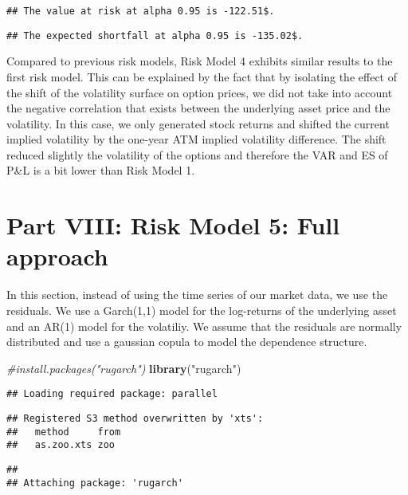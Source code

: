 \documentclass[]{article}
\newenvironment{Shaded}{\begin{snugshade}}{\end{snugshade}}
\newcommand{\CommentTok}[1]{\textcolor[rgb]{0.56,0.35,0.01}{\textit{#1}}}
\newcommand{\KeywordTok}[1]{\textcolor[rgb]{0.13,0.29,0.53}{\textbf{#1}}}
\newcommand{\NormalTok}[1]{#1}
\newcommand{\StringTok}[1]{\textcolor[rgb]{0.31,0.60,0.02}{#1}}
\begin{document}
\begin{verbatim}
## The value at risk at alpha 0.95 is -122.51$.
\end{verbatim}

\begin{verbatim}
## The expected shortfall at alpha 0.95 is -135.02$.
\end{verbatim}

Compared to previous risk models, Risk Model 4 exhibits similar results
to the first risk model. This can be explained by the fact that by
isolating the effect of the shift of the volatility surface on option
prices, we did not take into account the negative correlation that
exists between the underlying asset price and the volatility. In this
case, we only generated stock returns and shifted the current implied
volatility by the one-year ATM implied volatility difference. The shift
reduced slightly the volatility of the options and therefore the VAR and
ES of P\&L is a bit lower than Risk Model 1.

\hypertarget{part-viii-risk-model-5-full-approach}{%
\section{Part VIII: Risk Model 5: Full
approach}\label{part-viii-risk-model-5-full-approach}}

In this section, instead of using the time series of our market data, we
use the residuals. We use a Garch(1,1) model for the log-returns of the
underlying asset and an AR(1) model for the volatiliy. We assume that
the residuals are normally distributed and use a gaussian copula to
model the dependence structure.

\begin{Shaded}
\begin{Highlighting}[]
\CommentTok{\#install.packages("rugarch")}
\KeywordTok{library}\NormalTok{(}\StringTok{"rugarch"}\NormalTok{)}
\end{Highlighting}
\end{Shaded}

\begin{verbatim}
## Loading required package: parallel
\end{verbatim}

\begin{verbatim}
## Registered S3 method overwritten by 'xts':
##   method     from
##   as.zoo.xts zoo
\end{verbatim}

\begin{verbatim}
## 
## Attaching package: 'rugarch'
\end{verbatim}
\end{document}
